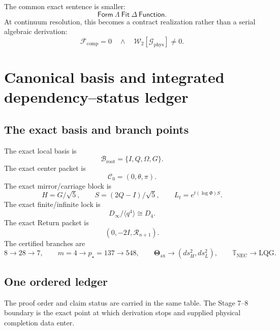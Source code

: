 \documentclass[11pt]{article}
\newcommand{\LMForm}{\mathsf{Form}}
\newcommand{\LMFit}{\mathsf{Fit}}
\newcommand{\LMFunction}{\mathsf{Function}}
\newcommand{\NEC}{\mathbb T_{\mathrm{NEC}}}
\begin{document}
The common exact sentence is smaller:
\[
\boxed{
\LMForm\ \Lambda\ \LMFit\ \Delta\ \LMFunction.
}
\]
At continuum resolution, this becomes a contract realization rather than a serial algebraic derivation:
\[
\boxed{
\mathcal F_{\mathrm{comp}}=0
\quad\land\quad
\mathcal W_2[\mathcal G_{\mathrm{phys}}]\neq0.
}
\]
\section{Canonical basis and integrated dependency--status ledger}

\subsection{The exact basis and branch points}
The exact local basis is
\[
\boxed{\mathcal B_{\mathrm{root}}=\{I,Q,\Omega,G\}.}
\]
The exact center packet is
\[
\boxed{\mathcal C_0=(0,\theta,\pi).}
\]
The exact mirror/carriage block is
\[
\boxed{
H=G/\sqrt5,
\qquad
S=(2Q-I)/\sqrt5,
\qquad
L_t=e^{t(\log\Phi)S}.
}
\]
The exact finite/infinite lock is
\[
\boxed{D_\infty/\langle q^4\rangle\cong D_4.}
\]
The exact Return packet is
\[
\boxed{(0,-2I,\mathcal R_{n+1}).}
\]
The certified branches are
\[
\boxed{
8\to28\to7,
\qquad
m=4\to p_\star=137\to548,
\qquad
\boldsymbol\Theta_{\mathrm{ax}}\to(ds_H^2,ds_L^2),
\qquad
\NEC\to\mathrm{LQG}.
}
\]

\subsection{One ordered ledger}
The proof order and claim status are carried in the same table. The Stage 7--8 boundary is the exact point at which derivation stops and supplied physical completion data enter.
\end{document}
